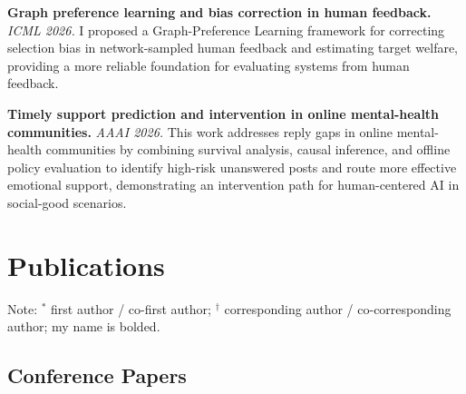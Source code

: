 \documentclass[a4paper,10pt]{article}
\newcommand{\cvlabel}[1]{\textbf{#1}}
\begin{document}
\begin{enumerate}[label=\textbf{[S\arabic*]}]
  \item \cvlabel{Graph preference learning and bias correction in human feedback.} \textit{ICML 2026.} I proposed a Graph-Preference Learning framework for correcting selection bias in network-sampled human feedback and estimating target welfare, providing a more reliable foundation for evaluating systems from human feedback.

  \item \cvlabel{Timely support prediction and intervention in online mental-health communities.} \textit{AAAI 2026.} This work addresses reply gaps in online mental-health communities by combining survival analysis, causal inference, and offline policy evaluation to identify high-risk unanswered posts and route more effective emotional support, demonstrating an intervention path for human-centered AI in social-good scenarios.
\end{enumerate}

\section*{Publications}
{\small\color{cvgray} Note: \(^*\) first author / co-first author; \(^\dagger\) corresponding author / co-corresponding author; my name is bolded.}

\subsection*{Conference Papers}
\end{document}
